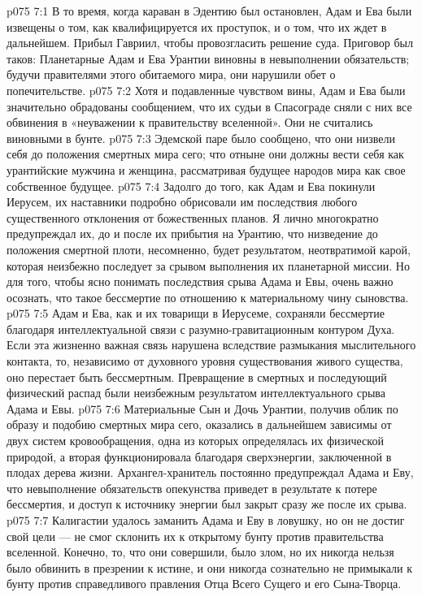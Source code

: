 \vs p075 7:1 В то время, когда караван в Эдентию был остановлен, Адам и Ева были извещены о том, как квалифицируется их проступок, и о том, что их ждет в дальнейшем. Прибыл Гавриил, чтобы провозгласить решение суда. Приговор был таков: Планетарные Адам и Ева Урантии виновны в невыполнении обязательств; будучи правителями этого обитаемого мира, они нарушили обет о попечительстве.
\vs p075 7:2 Хотя и подавленные чувством вины, Адам и Ева были значительно обрадованы сообщением, что их судьи в Спасограде сняли с них все обвинения в «неуважении к правительству вселенной». Они не считались виновными в бунте.
\vs p075 7:3 Эдемской паре было сообщено, что они низвели себя до положения смертных мира сего; что отныне они должны вести себя как урантийские мужчина и женщина, рассматривая будущее народов мира как свое собственное будущее.
\vs p075 7:4 Задолго до того, как Адам и Ева покинули Иерусем, их наставники подробно обрисовали им последствия любого существенного отклонения от божественных планов. Я лично многократно предупреждал их, до и после их прибытия на Урантию, что низведение до положения смертной плоти, несомненно, будет результатом, неотвратимой карой, которая неизбежно последует за срывом выполнения их планетарной миссии. Но для того, чтобы ясно понимать последствия срыва Адама и Евы, очень важно осознать, что такое бессмертие по отношению к материальному чину сыновства.
\vs p075 7:5 \bibnobreakspace Адам и Ева, как и их товарищи в Иерусеме, сохраняли бессмертие благодаря интеллектуальной связи с разумно\hyp{}гравитационным контуром Духа. Если эта жизненно важная связь нарушена вследствие размыкания мыслительного контакта, то, независимо от духовного уровня существования живого существа, оно перестает быть бессмертным. Превращение в смертных и последующий физический распад были неизбежным результатом интеллектуального срыва Адама и Евы.
\vs p075 7:6 \bibnobreakspace Материальные Сын и Дочь Урантии, получив облик по образу и подобию смертных мира сего, оказались в дальнейшем зависимы от двух систем кровообращения, одна из которых определялась их физической природой, а вторая функционировала благодаря сверхэнергии, заключенной в плодах дерева жизни. Архангел\hyp{}хранитель постоянно предупреждал Адама и Еву, что невыполнение обязательств опекунства приведет в результате к потере бессмертия, и доступ к источнику энергии был закрыт сразу же после их срыва.
\vs p075 7:7 \pc Калигастии удалось заманить Адама и Еву в ловушку, но он не достиг свой цели --- не смог склонить их к открытому бунту против правительства вселенной. Конечно, то, что они совершили, было злом, но их никогда нельзя было обвинить в презрении к истине, и они никогда сознательно не примыкали к бунту против справедливого правления Отца Всего Сущего и его Сына\hyp{}Творца.
